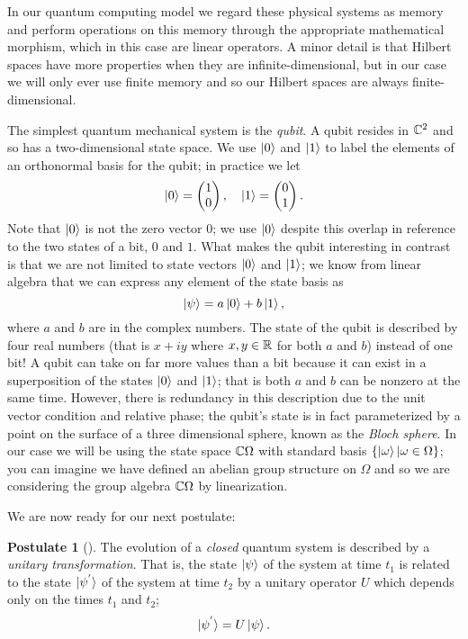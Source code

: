\documentclass[12pt,twoside]{reedthesis}
\theoremstyle{plain}   %
\theoremstyle{definition}
\newtheorem{post}{Postulate}[section]
\theoremstyle{remark}
\numberwithin{equation}{section}
\begin{document}
  In our quantum computing model we regard these physical systems as memory and perform operations on this memory through the appropriate mathematical morphism, which in this case are linear operators.
  A minor detail is that Hilbert spaces have more properties when they are infinite-dimensional, but in our case we will only ever use finite memory and so our Hilbert spaces are always finite-dimensional. \par
  The simplest quantum mechanical system is the \emph{qubit}. A qubit resides in $\mathbb{C}^2$ and so has a two-dimensional state space.
  We use $\ket{0}$ and $\ket{1}$ to label the elements of an orthonormal basis for the qubit; in practice we let
  \[\ket{0} =
    \begin{pmatrix}
      1 \\
      0
    \end{pmatrix},
    \quad
    \ket{1} =
    \begin{pmatrix}
      0 \\
      1
    \end{pmatrix}.
  \]
  Note that $\ket{0}$ is not the zero vector $0$; we use $\ket{0}$ despite this overlap in reference to the two states of a bit, $0$ and $1$.
  What makes the qubit interesting in contrast is that we are not limited to state vectors $\ket{0}$ and $\ket{1}$; we know from linear algebra that
  we can express any element of the state basis as
  \[\ket{\psi} = a \ket{0} + b \ket{1}, \]
  where $a$ and $b$ are in the complex numbers. The state of the qubit is described by four real numbers (that is $x +iy$ where $x,y \in \mathbb{R}$ for both $a$ and $b$) instead of one bit!
  A qubit can take on far more values than a bit because it can exist in a superposition of the states $\ket{0}$ and $\ket{1}$; that is both $a$ and $b$ can be nonzero at the same time.
  However, there is redundancy in this description due to the unit vector condition and relative phase; the qubit's state is in fact parameterized by a point on the surface of a three dimensional sphere, known as the \emph{Bloch sphere}.
  In our case we will be using the state space $\mathbb{C} \Omega$ with standard basis $\{ \ket{\omega} | \omega \in \Omega\}$; you can imagine we have defined an abelian group structure on $\Omega$ and so we are
  considering the group algebra $\mathbb{C} \Omega$ by linearization. \par
  We are now ready for our next postulate:
  \begin{post}[{\cite[2.2.2]{nielsen2010}}]
    The evolution of a \emph{closed} quantum system is described by a \emph{unitary transformation}. That is, the state $\ket{\psi}$ of the system at time $t_1$ is related to the state
    $\ket{ \psi^{'} }$ of the system at time $t_2$ by a unitary operator $U$ which depends only on the times $t_1$ and $t_2$;
    \[ \ket{\psi^{'}} = U \ket{\psi}.\]
  \end{post}
\end{document}

